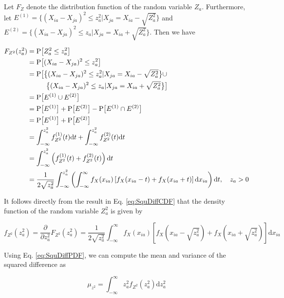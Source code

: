 \documentclass[10pt,letterpaper]{article}\usepackage[]{graphicx}\usepackage[]{color}
\begin{document}
Let $F_Z$ denote the distribution function of the random variable $Z_a$. Furthermore, let $E^{(1)}=\bigl\{(X_{ia}-X_{ja})^2 \leq z^2_a | X_{ja}=X_{ia}-\sqrt{Z^2_a}\bigr\}$ and $E^{(2)}=\bigl\{(X_{ia} - X_{ja})^2 \leq z_a | X_{ja}=X_{ia} + \sqrt{Z^2_a}\bigr\}$. Then we have

\begin{equation}\label{eq:SquDiffCDF}
\begin{aligned}
F_{Z^2}(z^2_a) &= \text{P}\bigl[Z^2_a \leq z^2_a\bigr] \\
&= \text{P}\bigl[(X_{ia} - X_{ja})^2 \leq z^2_a\bigr] \\
&= \text{P}\bigl[\bigl\{(X_{ia}-X_{ja})^2 \leq z^2_a | X_{ja}=X_{ia}-\sqrt{Z^2_a}\bigr\} \cup \\
&\hphantom{=} \quad \quad \bigl\{(X_{ia} - X_{ja})^2 \leq z_a | X_{ja}=X_{ia} + \sqrt{Z^2_a}\bigr\}\bigr] \\
&= \text{P}\bigl[E^{(1)} \cup E^{(2)}\bigr] \\
&= \text{P}\bigl[E^{(1)}\bigr] + \text{P}\bigl[E^{(2)}\bigr] - \text{P}\bigl[E^{(1)} \cap E^{(2)}\bigr] \\
&= \text{P}\bigl[E^{(1)}\bigr] + \text{P}\bigl[E^{(2)}\bigr] \\
&= \int_{-\infty}^{z^2_a} f^{(1)}_{Z^2}(t) \text{d}t + \int_{-\infty}^{z^2_a} f^{(2)}_{Z^2}(t) \text{d}t \\
&= \int_{-\infty}^{z^2_a} \left(f^{(1)}_{Z^2}(t) + f^{(2)}_{Z^2}(t)\right) \text{d}t \\
&= \frac{1}{2\sqrt{z^2_a}}\int_{-\infty}^{z^2_a} \left(\int_{-\infty}^{\infty}f_X(x_{ia})\left[f_X(x_{ia} - t) + f_X(x_{ia} + t)\right] \text{d}x_{ia}\right)\text{d}t, \quad z_a > 0
\end{aligned}
\end{equation}

It follows directly from the result in Eq. \ref{eq:SquDiffCDF} that the density function of the random variable $Z^2_a$ is given by

\begin{equation}\label{eq:SquDiffPDF}
f_{Z^2}(z^2_a) = \frac{\partial}{\partial z^2_a} F_{Z^2}(z^2_a) = \frac{1}{2\sqrt{z^2_a}}\int_{-\infty}^{\infty} f_X(x_{ia}) \left[f_X(x_{ia} - \sqrt{z^2_a}) + f_X(x_{ia} + \sqrt{z^2_a})\right] \text{d}x_{ia}
\end{equation}

Using Eq. \ref{eq:SquDiffPDF}, we can compute the mean and variance of the squared difference as

\begin{equation}\label{eq:1DSquDiffMean}
\mu_{z^2} = \int_{-\infty}^{\infty} z^2_a f_{Z^2}(z^2_a) \text{d}z^2_a
\end{equation}
\end{document}
